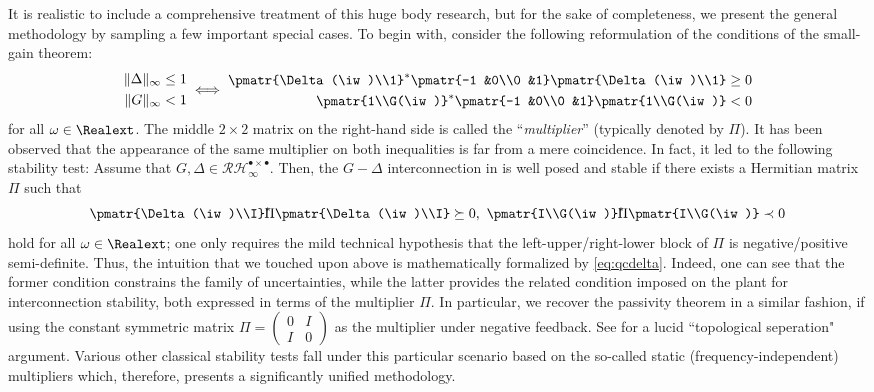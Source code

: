 It is realistic to include a comprehensive treatment of this huge body research, but for the 
sake of completeness, we present the general methodology by sampling a few important special cases. 
To begin with, consider the following reformulation of the conditions of the small-gain theorem:
\begin{equation}
\begin{aligned}
\|\Delta\|_\infty &\leq 1\\
\|G\|_\infty &< 1
\end{aligned} \iff
{\scriptstyle \begin{aligned}
\pmatr{\Delta(\iw)\\1}^*\pmatr{-1 &0\\0 &1}\pmatr{\Delta(\iw)\\1} &\geq 0\\
\pmatr{1\\G(\iw)}^*\pmatr{-1 &0\\0 &1}\pmatr{1\\G(\iw)} &< 0
\end{aligned}}
\label{eq:smqf}
\end{equation}
for all $\omega\in\Realext$. The middle {$2\times2$ matrix} on the right-hand side is called the 
``\emph{multiplier}'' (typically denoted by $\Pi$). It has been observed that the appearance of the 
same multiplier on both inequalities is far from a mere coincidence. In fact, it led to the following 
stability test: Assume that $G,\Delta\in \mathcal{RH}^{\bullet \times \bullet}_\infty$. Then, the 
$G-\Delta$ interconnection {in } is well posed and stable if there exists a 
Hermitian matrix $\Pi$ such that
\begin{equation}
\pmatr{\Delta(\iw)\\I}^*\!\!\!\Pi\pmatr{\Delta(\iw)\\I} \succeq 0,\
\pmatr{I\\G(\iw)}^*\!\!\!\Pi\pmatr{I\\G(\iw)} \prec 0  \label{eq:qcdelta}
\end{equation}
hold for all $\omega\in\Realext$; one only requires the mild technical hypothesis that the left-upper/right-lower 
block of $\Pi$ is negative/positive semi-definite. Thus, the intuition that we touched upon above is mathematically 
formalized by \eqref{eq:qcdelta}. Indeed, one can see that the former condition constrains the family of uncertainties,
 while the latter {provides the related condition} imposed on the plant for interconnection stability, both expressed 
in terms of the multiplier $\Pi$. In particular, we recover the passivity theorem in a similar fashion, if {using} 
the constant symmetric matrix $\Pi=\left(\begin{smallmatrix}0 &I \\ I &0 \end{smallmatrix} \right)$ as the multiplier 
under negative feedback. See \cite{safonov} for a lucid ``topological seperation" argument. Various other classical 
stability tests fall under this particular {scenario based on the so-called static (frequency-independent) multipliers 
which, therefore, presents} a significantly unified methodology.


